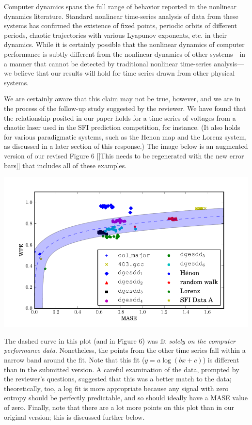 \documentclass[12pt]{article}
\newcommand{\alert}[1]{{\color{red}#1}}
\begin{document}
Computer dynamics spans the full range of behavior reported in the
nonlinear dynamics literature.  Standard nonlinear time-series
analysis of data from these systems has confirmed the existence of
fixed points, periodic orbits of different periods, chaotic
trajectories with various Lyapunov exponents, etc.  in their dynamics.
While it is certainly possible that the nonlinear dynamics of computer
performance is subtly different from the nonlinear dynamics of other
systems---in a manner that cannot be detected by traditional nonlinear
time-series analysis---we believe that our results will hold for time
series drawn from other physical systems.  

We are certainly aware that this claim may not be true, however, and
we are in the process of the follow-up study suggested by the
reviewer.  We have found that the relationship posited in our paper
holds for a time series of voltages from a chaotic laser used in the
SFI prediction competition, for instance.  (It also holds for various
paradigmatic systems, such as the Henon map and the Lorenz system, as
discussed in a later section of this response.)  The image below is an
augmented version of our \alert{revised Figure 6 [[This needs to be
      regenerated with the new error bars]]} that includes all of
these examples.

\begin{center}
    \includegraphics[width=0.8\columnwidth]{figs/new_prediction_vs_entropy_extra_autolog}
\end{center}

\noindent The dashed curve in this plot (and in Figure 6) was fit
\emph{solely on the computer performance data}.  Nonetheless, the
points from the other time series fall within a narrow band around the
fit.  Note that this fit ($y = a \log(b x + c)$) is different than in
the submitted version.  A careful examination of the data, prompted by
the reviewer's questions, suggested that this was a better match to
the data; theoretically, too, a log fit is more appropriate because
any signal with zero entropy should be perfectly predictable, and so
should ideally have a MASE value of zero.  Finally, note that there
are a lot more points on this plot than in our original version; this
is discussed further below.
\end{document}

